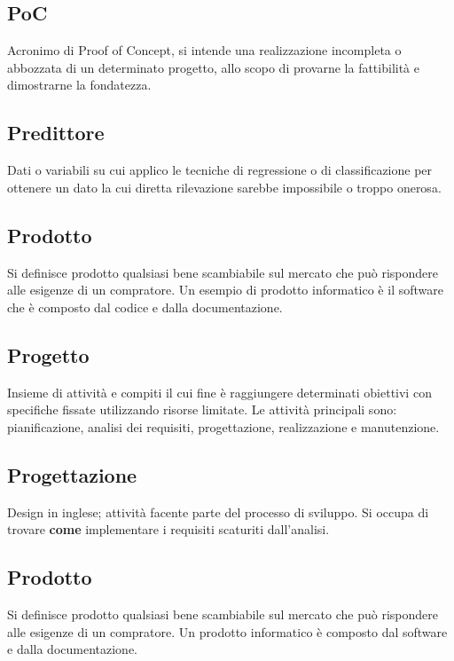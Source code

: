 \subsection*{PoC}
Acronimo di Proof of Concept, si intende una realizzazione incompleta o abbozzata di un determinato progetto, allo scopo di provarne la fattibilità e dimostrarne la fondatezza.


\subsection*{Predittore}
Dati o variabili su cui applico le tecniche di regressione o di classificazione per ottenere un dato la cui diretta rilevazione sarebbe impossibile o troppo onerosa.

\subsection*{Prodotto}
Si definisce prodotto qualsiasi bene scambiabile sul mercato che può rispondere alle esigenze di un compratore. Un esempio di prodotto informatico è il software che è composto dal codice e dalla documentazione.

\subsection*{Progetto}
Insieme di attività e compiti il cui fine è raggiungere determinati obiettivi con specifiche fissate utilizzando risorse limitate. Le attività principali sono: pianificazione, analisi dei requisiti, progettazione, realizzazione e manutenzione.

\subsection*{Progettazione}
Design in inglese; attività facente parte del processo di sviluppo. Si occupa di trovare \textbf{come} implementare i requisiti scaturiti dall'analisi.

\subsection*{Prodotto}
Si definisce prodotto qualsiasi bene scambiabile sul mercato che può rispondere alle esigenze di un compratore. Un prodotto informatico è composto dal software e dalla documentazione.

